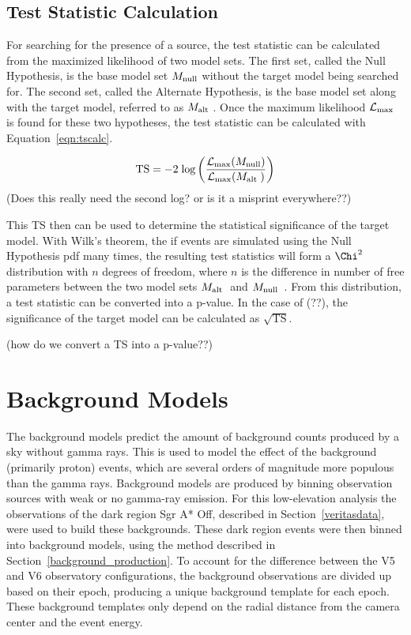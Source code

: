   
  \subsection{Test Statistic Calculation}
  
  For searching for the presence of a source, the test statistic can be calculated from the maximized likelihood of two model sets.
  The first set, called the Null Hypothesis, is the base model set $M_\textrm{null}$ without the target model being searched for.
  The second set, called the Alternate Hypothesis, is the base model set along with the target model, referred to as $M_\textrm{alt }$.
  Once the maximum likelihood $\mathcal{L}_{\textrm{max}}$ is found for these two hypotheses, the test statistic can be calculated with Equation~\ref{eqn:tscalc}.
  
  \begin{equation}\label{eqn:tscalc}
    \textrm{TS} = - 2 \; \textrm{log} \left (  \frac{ \mathcal{L}_{\textrm{max}}( M_\textrm{null} ) }{ \mathcal{L}_{\textrm{max}}( M_\textrm{alt } ) } \right )
  \end{equation}
  {\color{red}(Does this really need the second log? or is it a misprint everywhere??)}
  
  This TS then can be used to determine the statistical significance of the target model.
  With Wilk's theorem, the if events are simulated using the Null Hypothesis pdf many times, the resulting test statistics will form a $\Chi^2$ distribution with $n$ degrees of freedom, where $n$ is the difference in number of free parameters between the two model sets $M_\textrm{alt }$ and $M_\textrm{null}$~\cite{wilks1938}.
  From this distribution, a test statistic can be converted into a p-value.
  In the case of {\color{red}(??)}, the significance of the target model can be calculated as $\sqrt{\textrm{TS}}$.
  
  {\color{red}(how do we convert a TS into a p-value??)}
  

\section{Background Models}\label{sec:bkgmodels}
  The background models predict the amount of background counts produced by a sky without gamma rays.
  This is used to model the effect of the background (primarily proton) events, which are several orders of magnitude more populous than the gamma rays.
  Background models are produced by binning observation sources with weak or no gamma-ray emission.
  For this low-elevation analysis the observations of the dark region Sgr A* Off, described in Section~\ref{veritasdata}, were used to build these backgrounds.
  These dark region events were then binned into background models, using the method described in Section~\ref{background_production}.
  To account for the difference between the V5 and V6 observatory configurations, the background observations are divided up based on their epoch, producing a unique background template for each epoch.
  These background templates only depend on the radial distance from the camera center and the event energy.

